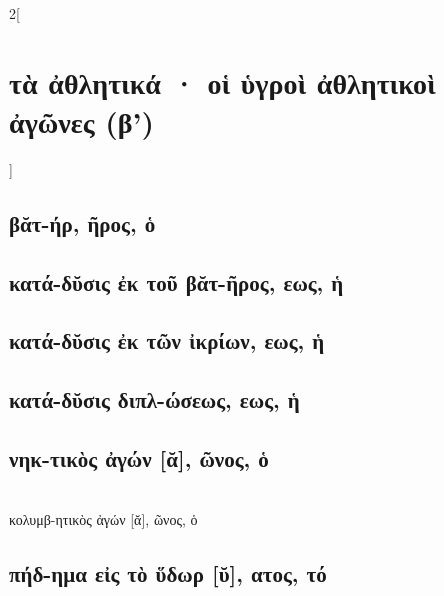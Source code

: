 \documentclass{book}
\begin{document}
\begin{multicols}{2}[\section{τὰ ἀθλητικά · οἱ ὑγροὶ ἀθλητικοὶ ἀγῶνες (β')}]
\subsection{βᾰτ-ήρ, ῆρος, ὁ}
\subsection{κατά-δῠσις ἐκ τοῦ βᾰτ-ῆρος, εως, ἡ}
\subsection{κατά-δῠσις ἐκ τῶν ἰκρίων, εως, ἡ}
\subsection{κατά-δῠσις διπλ-ώσεως, εως, ἡ}
\subsection{νηκ-τικὸς ἀγών [ᾰ], ῶνος, ὁ}
 ~\\
{κολυμβ-ητικὸς ἀγών [ᾰ], ῶνος, ὁ}
\subsection{πήδ-ημα εἰς τὸ ὕδωρ [ῠ], ατος, τό}
~
\end{multicols}
\newpage  
\end{document}
